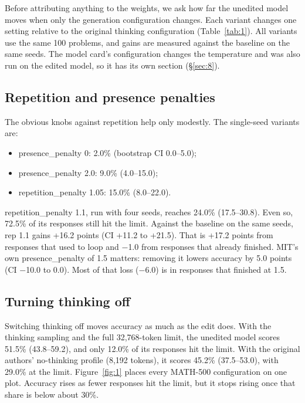 \documentclass[11pt]{article}
\begin{document}
Before attributing anything to the weights, we ask how far the unedited model moves when only the generation configuration changes. Each variant changes one setting relative to the original thinking configuration (Table~\ref{tab:1}). All variants use the same 100 problems, and gains are measured against the baseline on the same seeds. The model card's configuration changes the temperature and was also run on the edited model, so it has its own section (\S\ref{sec:8}).

\subsection{Repetition and presence penalties}\label{sec:5.1}

The obvious knobs against repetition help only modestly. The single-seed variants are:

\begin{itemize}[nosep,leftmargin=*]
\item presence\_\allowbreak{}penalty 0: 2.0\% (bootstrap CI 0.0--5.0);
\item presence\_\allowbreak{}penalty 2.0: 9.0\% (4.0--15.0);
\item repetition\_\allowbreak{}penalty 1.05: 15.0\% (8.0--22.0).
\end{itemize}

repetition\_\allowbreak{}penalty 1.1, run with four seeds, reaches 24.0\% (17.5--30.8). Even so, 72.5\% of its responses still hit the limit. Against the baseline on the same seeds, rep 1.1 gains +16.2 points (CI +11.2 to +21.5). That is +17.2 points from responses that used to loop and $-$1.0 from responses that already finished. MIT's own presence\_\allowbreak{}penalty of 1.5 matters: removing it lowers accuracy by 5.0 points (CI $-$10.0 to 0.0). Most of that loss ($-$6.0) is in responses that finished at 1.5.

\subsection{Turning thinking off}\label{sec:5.2}

Switching thinking off moves accuracy as much as the edit does. With the thinking sampling and the full 32,768-token limit, the unedited model scores 51.5\% (43.8--59.2), and only 12.0\% of its responses hit the limit. With the original authors' no-thinking profile (8,192 tokens), it scores 45.2\% (37.5--53.0), with 29.0\% at the limit. Figure~\ref{fig:1} places every MATH-500 configuration on one plot. Accuracy rises as fewer responses hit the limit, but it stops rising once that share is below about 30\%.
\end{document}
